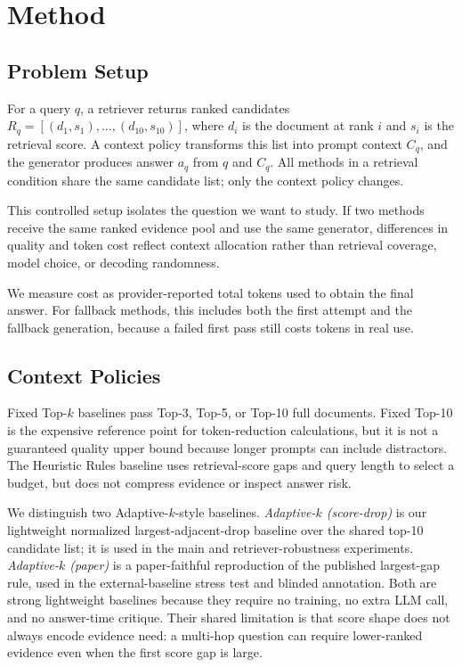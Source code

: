\documentclass[11pt]{article}
\begin{document}
\section{Method}

\subsection{Problem Setup}

For a query $q$, a retriever returns ranked candidates $R_q=[(d_1,s_1),\ldots,(d_{10},s_{10})]$, where $d_i$ is the document at rank $i$ and $s_i$ is the retrieval score. A context policy transforms this list into prompt context $C_q$, and the generator produces answer $a_q$ from $q$ and $C_q$. All methods in a retrieval condition share the same candidate list; only the context policy changes.

This controlled setup isolates the question we want to study. If two methods receive the same ranked evidence pool and use the same generator, differences in quality and token cost reflect context allocation rather than retrieval coverage, model choice, or decoding randomness.

We measure cost as provider-reported total tokens used to obtain the final answer. For fallback methods, this includes both the first attempt and the fallback generation, because a failed first pass still costs tokens in real use.

\subsection{Context Policies}

Fixed Top-$k$ baselines pass Top-3, Top-5, or Top-10 full documents. Fixed Top-10 is the expensive reference point for token-reduction calculations, but it is not a guaranteed quality upper bound because longer prompts can include distractors. The Heuristic Rules baseline uses retrieval-score gaps and query length to select a budget, but does not compress evidence or inspect answer risk.

We distinguish two Adaptive-$k$-style baselines. \emph{Adaptive-$k$ (score-drop)} is our lightweight normalized largest-adjacent-drop baseline over the shared top-10 candidate list; it is used in the main and retriever-robustness experiments. \emph{Adaptive-$k$ (paper)} is a paper-faithful reproduction of the published largest-gap rule, used in the external-baseline stress test and blinded annotation. Both are strong lightweight baselines because they require no training, no extra LLM call, and no answer-time critique. Their shared limitation is that score shape does not always encode evidence need: a multi-hop question can require lower-ranked evidence even when the first score gap is large.
\end{document}
